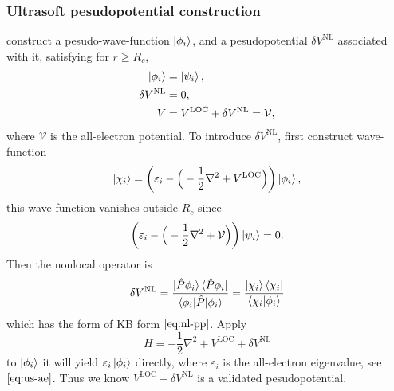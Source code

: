 
\subsubsection{Ultrasoft pesudopotential construction}
\label{sssec:us}

\citeauthor{Vanderbilt:1990is} construct a pesudo-wave-function $\ket{ \phi_i }$, and a
pesudopotential $\delta V^\text{NL}$ associated with it,
satisfying for $r \ge R_c$,
\begin{align}
	\ket{ \phi_i }                        & = \ket{ \psi_i }, \\
	\delta V^\text{NL}                    & = 0,              \\
	V &= V^\text{LOC} + \delta V^\text{NL} = \mathcal{V},
\end{align}
where $\mathcal{V}$ is the all-electron potential.
To introduce $\delta V^\text{NL}$, first construct wave-function
\begin{equation}
	\ket{ \chi_i } = \bigg( \varepsilon_i -
	\Big( - \frac{ 1 }{ 2 } \nabla^2 + V^\text{LOC} \Big)
	\bigg) \ket{ \phi_i },
\end{equation}
this wave-function vanishes outside $R_c$ since
\begin{equation}\label{eq:us-ae}
	\bigg( \varepsilon_i -
	\Big( - \frac{ 1 }{ 2 } \nabla^2 + \mathcal{V} \Big)
	\bigg) \ket{ \psi_i } = 0.
\end{equation}
Then the nonlocal operator is
\begin{equation}\label{eq:us-pp}
	\delta V^\text{NL} = \frac{ \ket{\hat{P} \phi_i } \bra{ \hat{P} \phi_i }}{
		\braket{ \phi_i | \hat{P} | \phi_i } }
	=
	\frac{ \ket{ \chi_i } \bra{ \chi_i } }{
		\braket{ \chi_i | \phi_i }
	}
\end{equation}
which has the form of KB form $\eqref{eq:nl-pp}$.
Apply
\begin{equation}
	H =  - \frac{ 1 }{ 2 } \nabla^2 + V^\text{LOC} + \delta V^\text{NL}
\end{equation}
to $\ket{ \phi_i }$ it will yield $\varepsilon_i \ket{ \phi_i }$ directly,
where $\varepsilon_i$ is the all-electron eigenvalue, see $\eqref{eq:us-ae}$.
Thus we know $V^\text{LOC} + \delta V^\text{NL}$ is a validated
pesudopotential.